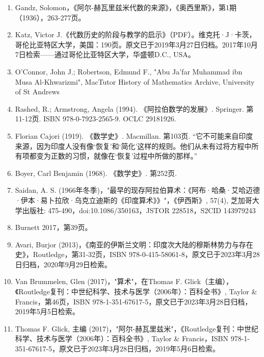 \begin{enumerate}
\item Gandz, Solomon，《阿尔-赫瓦里兹米代数的来源》，《奥西里斯》，第1期（1936），263-277页。  
\item Katz, Victor J.《代数历史的阶段与教学的启示》（PDF）。维克托·J·卡茨，哥伦比亚特区大学，美国：190页。原文已于2019年3月27日归档。2017年10月7日检索——通过哥伦比亚特区大学，华盛顿D.C., USA。
\item O'Connor, John J.; Robertson, Edmund F., "Abu Ja'far Muhammad ibn Musa Al-Khwarizmi", MacTutor History of Mathematics Archive, University of St Andrews  
\item Rashed, R.; Armstrong, Angela (1994). 《阿拉伯数学的发展》. Springer. 第11-12页. ISBN 978-0-7923-2565-9. OCLC 29181926.  
\item Florian Cajori (1919). 《数学史》. Macmillan. 第103页. “它不可能来自印度来源，因为印度人没有像‘恢复’和‘简化’这样的规则。他们从未有过将方程中所有项都变为正数的习惯，就像在‘恢复’过程中所做的那样。”  
\item Boyer, Carl Benjamin (1968). 《数学史》. 第252页.  
\item Saidan, A. S. (1966年冬季)，"最早的现存阿拉伯算术：《阿布·哈桑·艾哈迈德·伊本·易卜拉欣·乌克立迪斯的《印度算术》》"，《伊西斯》, 57(4), 芝加哥大学出版社: 475-490，doi:10.1086/350163，JSTOR 228518，S2CID 143979243  
\item Burnett 2017，第39页。  
\item Avari, Burjor (2013)，《南亚的伊斯兰文明：印度次大陆的穆斯林势力与存在史》，Routledge，第31-32页，ISBN 978-0-415-58061-8，原文已于2023年3月28日归档，2020年9月29日检索。  
\item Van Brummelen, Glen (2017)，"算术"，在Thomas F. Glick（主编），《Routledge复刊：中世纪科学、技术与医学（2006年）：百科全书》, Taylor & Francis，第46页，ISBN 978-1-351-67617-5，原文已于2023年3月28日归档，2019年5月5日检索。  
\item Thomas F. Glick, 主编 (2017)，"阿尔-赫瓦里兹米"，《Routledge复刊：中世纪科学、技术与医学（2006年）：百科全书》, Taylor & Francis，ISBN 978-1-351-67617-5，原文已于2023年3月28日归档，2019年5月6日检索。
\end{enumerate}
